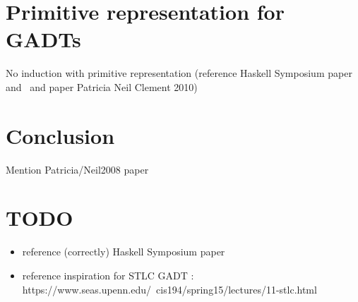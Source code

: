 \documentclass[acmsmall,screen,review,anonymous]{acmart}
\theoremstyle{definition}
\begin{document}
\section{Primitive representation for GADTs}

No induction with primitive representation (reference Haskell Symposium paper and~\cite{jp19} and paper Patricia Neil Clement 2010)



\section{Conclusion}

Mention Patricia/Neil2008 paper



\section{TODO}

\begin{itemize}
\item reference (correctly) Haskell Symposium paper
\item reference inspiration for STLC GADT : https://www.seas.upenn.edu/~cis194/spring15/lectures/11-stlc.html

\end{itemize}


%
%



\end{document}
